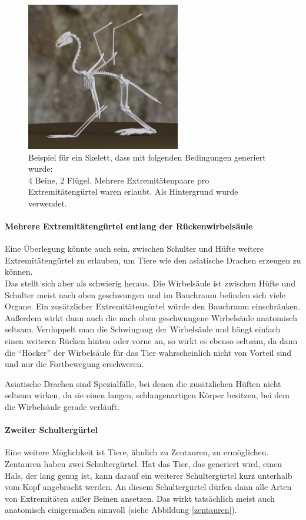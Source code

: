 \begin{figure}
 \centering
 \includegraphics[width=0.6\textwidth]{../java_skeleton_generation/example_skeletons/pegasus.jpg}
 \caption{Beispiel für ein Skelett, dass mit folgenden Bedingungen generiert wurde:\\ $4$ Beine, $2$ Flügel. Mehrere Extremitätenpaare pro Extremitätengürtel waren erlaubt. Als Hintergrund wurde \cite{background} verwendet.}
 \label{pegasus}
\end{figure}


\paragraph{Mehrere Extremitätengürtel entlang der Rückenwirbelsäule}
Eine Überlegung könnte auch sein, zwischen Schulter und Hüfte weitere Extremitätengürtel zu erlauben, um \zb Tiere wie den asiatische Drachen erzeugen zu können. \\
Das stellt sich aber als schwierig heraus. Die Wirbelsäule ist zwischen Hüfte und Schulter meist nach oben geschwungen und im Bauchraum befinden sich viele Organe. Ein zusätzlicher Extremitätengürtel würde den Bauchraum einschränken. Außerdem wirkt dann auch die nach oben geschwungene Wirbelsäule anatomisch seltsam.
Verdoppelt man die Schwingung der Wirbelsäule und hängt einfach einen weiteren Rücken hinten oder vorne an, so wirkt es ebenso seltsam, da dann die "`Höcker"' der Wirbelsäule für das Tier wahrscheinlich nicht von Vorteil sind und nur die Fortbewegung erschweren.

Asiatische Drachen sind Spezialfälle, bei denen die zusätzlichen Hüften nicht seltsam wirken, da sie einen langen, schlangenartigen Körper besitzen, bei dem die Wirbelsäule gerade verläuft.

\paragraph{Zweiter Schultergürtel}
Eine weitere Möglichkeit ist Tiere, ähnlich zu Zentauren, zu ermöglichen. Zentauren haben zwei Schultergürtel. Hat das Tier, das generiert wird, einen Hals, der lang genug ist, kann darauf ein weiterer Schultergürtel kurz unterhalb vom Kopf angebracht werden. An diesem Schultergürtel dürfen dann alle Arten von Extremitäten außer Beinen ansetzen. Das wirkt tatsächlich meist auch anatomisch einigermaßen sinnvoll (siehe Abbildung \ref{zentauren}).

